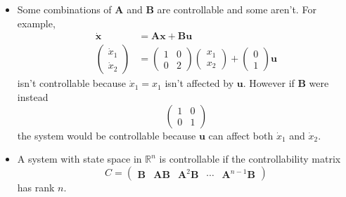 \documentclass{article}
\renewcommand{\vec}[1]{\boldsymbol{\mathbf{#1}}}
\newcommand{\dvec}[1]{\dot{\vec{#1}}}
\begin{document}
\begin{itemize}
  \item Some combinations of $\vec{A}$ and $\vec{B}$ are controllable and some aren't. For example, \begin{align*}
          \dvec{x}        & = \vec{A} \vec{x} + \vec{B} \vec{u}                 \\
          \begin{pmatrix}
            \dot{x}_1 \\
            \dot{x}_2
          \end{pmatrix} & = \begin{pmatrix}
                              1 & 0 \\
                              0 & 2
                            \end{pmatrix} \begin{pmatrix}
                                            x_1 \\
                                            x_2
                                          \end{pmatrix} + \begin{pmatrix}
                                                            0 \\
                                                            1
                                                          \end{pmatrix} \vec{u}
        \end{align*} isn't controllable because $\dot{x}_1 = x_1$ isn't affected by $\vec{u}$. However if $\vec{B}$ were instead \[\begin{pmatrix}
            1 & 0 \\
            0 & 1
          \end{pmatrix}\] the system would be controllable because $\vec{u}$ can affect both $\dot{x}_1$ and $\dot{x}_2$.

  \item A system with state space in $\mathbb{R}^n$ is controllable if the controllability matrix \[C = \begin{pmatrix}
            \vec{B} & \vec{A} \vec{B} & \vec{A}^2 \vec{B} & \cdots & \vec{A}^{n - 1} \vec{B}
          \end{pmatrix}\] has rank $n$.
\end{itemize}
\end{document}
